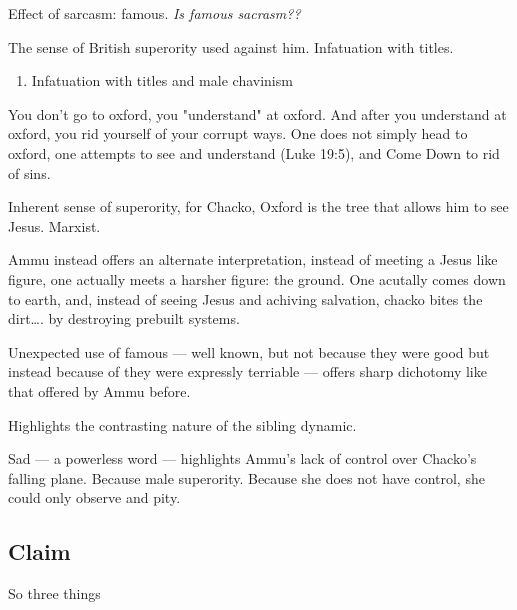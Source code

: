 \documentclass[letterpaper]{article}
\begin{document}
Effect of sarcasm: famous. \emph{Is famous sacrasm??}

The sense of British superority used against him. Infatuation with
titles.

\begin{enumerate}
\item Infatuation with titles and male chavinism
\end{enumerate}

You don't go to oxford, you "understand" at oxford. And after you
understand at oxford, you rid yourself of your corrupt ways. One does
not simply head to oxford, one attempts to see and understand (Luke
19:5), and Come Down to rid of sins.

Inherent sense of superority, for Chacko, Oxford is the tree that allows
him to see Jesus. Marxist.

Ammu instead offers an alternate interpretation, instead of meeting a
Jesus like figure, one actually meets a harsher figure: the ground. One
acutally comes down to earth, and, instead of seeing Jesus and achiving
salvation, chacko bites the dirt\ldots{}. by destroying prebuilt systems.

Unexpected use of famous --- well known, but not because they were good
but instead because of they were expressly terriable --- offers sharp
dichotomy like that offered by Ammu before.

Highlights the contrasting nature of the sibling dynamic.

Sad --- a powerless word --- highlights Ammu's lack of control over
Chacko's falling plane. Because male superority. Because she does not
have control, she could only observe and pity.

\subsection{Claim}
\label{sec:org91aca69}
So three things
\end{document}

